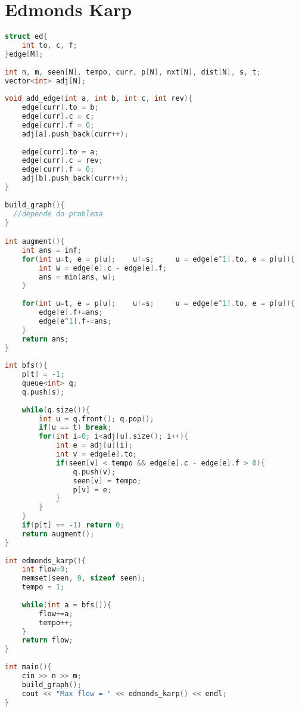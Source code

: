 \documentclass[12pt,a4paper,twoside]{report}
\begin{document}
\section{Edmonds Karp}
\noindent\begin{lstlisting}[caption=Edmonds Karp,language=C++]
struct ed{
    int to, c, f;
}edge[M];
 
int n, m, seen[N], tempo, curr, p[N], nxt[N], dist[N], s, t;
vector<int> adj[N];
 
void add_edge(int a, int b, int c, int rev){
    edge[curr].to = b;
    edge[curr].c = c;
    edge[curr].f = 0;
    adj[a].push_back(curr++);
     
    edge[curr].to = a;
    edge[curr].c = rev;
    edge[curr].f = 0;
    adj[b].push_back(curr++);
}
 
build_graph(){
  //depende do problema
}

int augment(){
    int ans = inf;
    for(int u=t, e = p[u];    u!=s;     u = edge[e^1].to, e = p[u]){
        int w = edge[e].c - edge[e].f;
        ans = min(ans, w);
    }
 
    for(int u=t, e = p[u];    u!=s;     u = edge[e^1].to, e = p[u]){
        edge[e].f+=ans;
        edge[e^1].f-=ans;
    }
    return ans;
}
 
int bfs(){    
    p[t] = -1;
    queue<int> q;
    q.push(s);
     
    while(q.size()){
        int u = q.front(); q.pop();
        if(u == t) break;
        for(int i=0; i<adj[u].size(); i++){
            int e = adj[u][i];
            int v = edge[e].to;
            if(seen[v] < tempo && edge[e].c - edge[e].f > 0){
                q.push(v);
                seen[v] = tempo;
                p[v] = e;
            }
        }
    }
    if(p[t] == -1) return 0;
    return augment();
}
 
int edmonds_karp(){
    int flow=0;
    memset(seen, 0, sizeof seen);
    tempo = 1;
     
    while(int a = bfs()){
        flow+=a;
        tempo++;
    }
    return flow;
}
 
int main(){    
    cin >> n >> m;
    build_graph();
    cout << "Max flow = " << edmonds_karp() << endl;
}
\end{lstlisting}
\end{document}
